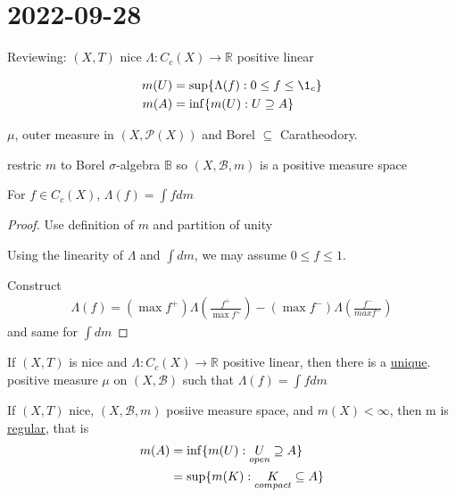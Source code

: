 \section{ 2022-09-28 }


Reviewing: $(X,T)$ nice $\Lambda : C_c (X) \to \mathbb{R}$ positive linear

\begin{align*}
	m(U) &= \sup\{\Lambda(f) : 0 \leq f \leq \1_c\} \\
	m(A) &= \inf\{m(U) : U \contains  A\}
\end{align*} 

\begin{lemma}
	$\mu$, outer measure in  $(X,\mathcal{P}(X))$ and Borel $\subseteq$ Caratheodory.
\end{lemma}

\begin{lemma}
	restric $m$ to Borel $\sigma$-algebra $\mathbb{B}$ so $(X, \mathcal{B}, m)$ is a positive measure space
\end{lemma}

\begin{lemma}
	For $f \in C_c (X)$, $\Lambda(f) = \int f dm$
\end{lemma}

\begin{proof}
	Use definition of $m$ and partition of unity

	Using the linearity of $\Lambda$ and  $\int dm$, we may assume $0 \leq f \leq 1.$

	Construct 
	 \begin{align*}
	    \Lambda (f) = ( \max f^+ ) \Lambda \left(\frac{f^+}{\max f^+}\right) - (\max f^- ) \Lambda \left(\frac{f^-}{max f^-} \right)
	\end{align*} 
	and same for $\int dm$
\end{proof}




\begin{theorem}
	If $(X,T)$ is nice and  $\Lambda : C_c (X) \to \mathbb{R}$ positive linear, then there is a \underline{unique}. positive measure $\mu$ on $(X,\mathcal{B})$ such that  $\Lambda(f) = \int f dm$
\end{theorem}

\begin{lemma}
	If $(X,T)$ nice,  $(X, \mathcal{B}, m)$ posiive measure space, and $m(X) < \infty$, then m is \underline{regular}, that is
	\begin{align}
		m(A) &= \inf\{m(U) : \underset{open}{U} \supseteq A\} \\
			 &= \sup\{m(K) : \underset{compact}{K} \subseteq A\}
	\end{align} 
\end{lemma}

